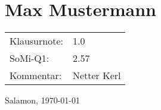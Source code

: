 \documentclass[a6paper,10pt]{scrartcl}
\begin{document}
\section*{Max Mustermann} \begin{tabularx}{\textwidth}{lX}
 Klausurnote: &1.0\\
 SoMi-Q1: &2.57\\
 Kommentar: &Netter Kerl\end{tabularx}

 \vfill Salamon, \today
 \clearpage
 
 
\end{document}
